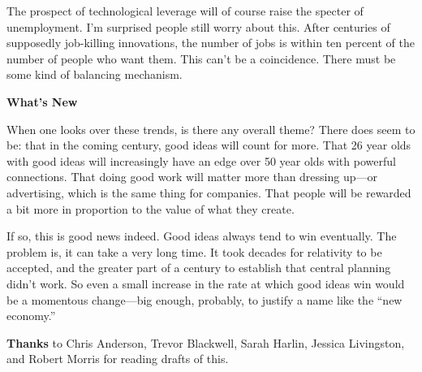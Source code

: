 The prospect of technological leverage will of course raise the specter
of unemployment. I'm surprised people still worry about this. After
centuries of supposedly job-killing innovations, the number of jobs is
within ten percent of the number of people who want them. This can't be
a coincidence. There must be some kind of balancing mechanism.

\textbf{What's New}

When one looks over these trends, is there any overall theme? There does
seem to be: that in the coming century, good ideas will count for more.
That 26 year olds with good ideas will increasingly have an edge over 50
year olds with powerful connections. That doing good work will matter
more than dressing up---or advertising, which is the same thing for
companies. That people will be rewarded a bit more in proportion to the
value of what they create.

If so, this is good news indeed. Good ideas always tend to win
eventually. The problem is, it can take a very long time. It took
decades for relativity to be accepted, and the greater part of a century
to establish that central planning didn't work. So even a small increase
in the rate at which good ideas win would be a momentous change---big
enough, probably, to justify a name like the ``new economy.''


\textbf{Thanks} to Chris Anderson, Trevor Blackwell, Sarah Harlin,
Jessica Livingston, and Robert Morris for reading drafts of this.
